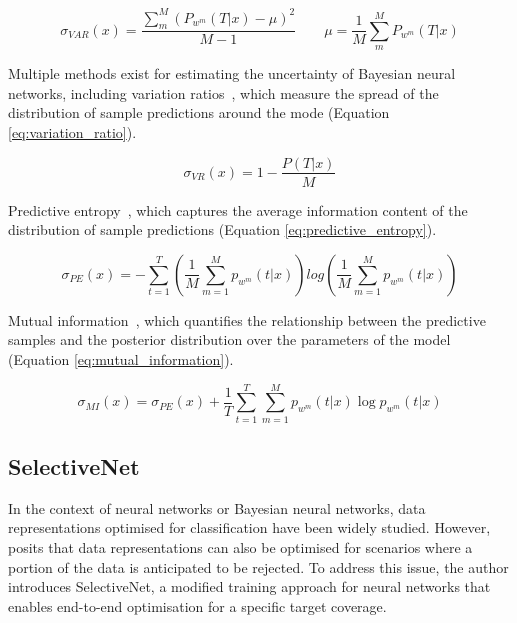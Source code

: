 \begin{equation}
	\sigma_{VAR}(x) = \frac{\sum_m^M (P_{w^m}(T|x) - \mu)^2}{M - 1} \qquad \mu = \frac{1}{M} \sum_m^M P_{w^m}(T|x)
	\label{eq:var_baysian_neural_network}
\end{equation}

Multiple methods exist for estimating the uncertainty of Bayesian neural networks, including variation ratios~\citep{freeman1965elementary}, which measure the spread of the distribution of sample predictions around the mode (Equation \ref{eq:variation_ratio}).

\begin{equation}
	\sigma_{VR}(x) = 1 - \frac{P(T|x)}{M}    
	\label{eq:variation_ratio}
\end{equation}

\noindent Predictive entropy~\citep{shannon1948mathematical}, which captures the average information content of the distribution of sample predictions (Equation \ref{eq:predictive_entropy}).
   
\begin{equation}
	\sigma_{PE}(x) = -\sum^{T}_{t=1}\left(\frac{1}{M}\sum^{M}_{m=1}p_{w^m}(t|x)\right)log\left(\frac{1}{M}\sum^{M}_{m=1}p_{w^m}(t|x)\right)
	\label{eq:predictive_entropy}
\end{equation}

\noindent Mutual information~\citep{houlsby2011bayesian}, which quantifies the relationship between the predictive samples and the posterior distribution over the parameters of the model (Equation \ref{eq:mutual_information}).

\begin{equation}
	\sigma_{MI}(x)=\sigma_{PE}(x)+\frac{1}{T}\sum^{T}_{t=1}\sum^{M}_{m=1}p_{w^m}(t|x)\log p_{w^m}(t|x)
	\label{eq:mutual_information}
\end{equation}

\subsection{SelectiveNet}
\label{subsec:selectivenet}
In the context of neural networks or Bayesian neural networks, data representations optimised for classification have been widely studied. However, \cite{geifman2019selectivenet} posits that data representations can also be optimised for scenarios where a portion of the data is anticipated to be rejected. To address this issue, the author introduces SelectiveNet, a modified training approach for neural networks that enables end-to-end optimisation for a specific target coverage.

